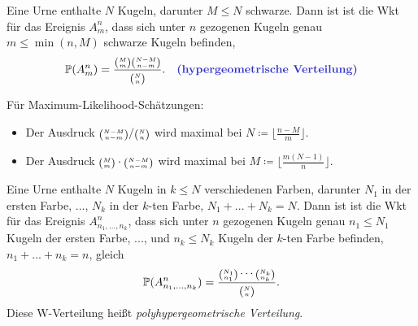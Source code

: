 \documentclass{cheat-sheet}
\renewcommand{\P}{\mathbb{P}} %
\let\myBinom\binom
\renewcommand{\binom}[2]{\mathsmaller{\myBinom{#1}{#2}}}
\begin{document}







\begin{modell}
  Eine Urne enthalte $N$ Kugeln, darunter $M \leq N$ schwarze. Dann ist ist die Wkt für das Ereignis $A^n_m$, dass sich unter $n$ gezogenen Kugeln genau $m \leq \min(n, M)$ schwarze Kugeln befinden,
  \[ \P(A^n_m) = \frac{\binom{M}{m} \binom{N - M}{n - m}}{\binom{N}{n}}. \quad \text{\emph{(hypergeometrische Verteilung)}} \]
\end{modell}


\begin{bem}
  Für Maximum-Likelihood-Schätzungen:
  \begin{itemize}
    \item Der Ausdruck $\binom{N-M}{n-m} / \binom{N}{n}$ wird maximal bei $N \coloneqq \lfloor \tfrac{n-M}{m} \rfloor$.
    \item Der Ausdruck $\binom{M}{m} \cdot \binom{N-M}{n-m}$ wird maximal bei $M \coloneqq \lfloor \tfrac{m (N-1)}{n} \rfloor$.
  \end{itemize}
\end{bem}


\begin{modell}
  Eine Urne enthalte $N$ Kugeln in $k \leq N$ verschiedenen Farben, darunter $N_1$ in der ersten Farbe, ..., $N_k$ in der $k$-ten Farbe, $N_1 + ... + N_k = N$. Dann ist ist die Wkt für das Ereignis $A^n_{n_1,...,n_k}$, dass sich unter $n$ gezogenen Kugeln genau $n_1 \leq N_1$ Kugeln der ersten Farbe, ..., und $n_k \leq N_k$ Kugeln der $k$-ten Farbe befinden, $n_1 + ... + n_k = n$, gleich
  \[ \P(A^n_{n_1, ..., n_k}) = \frac{\binom{N_1}{n_1} \cdots \binom{N_k}{n_k}}{\binom{N}{n}}. \]
  Diese W-Verteilung heißt \emph{polyhypergeometrische Verteilung}.
\end{modell}
\end{document}
